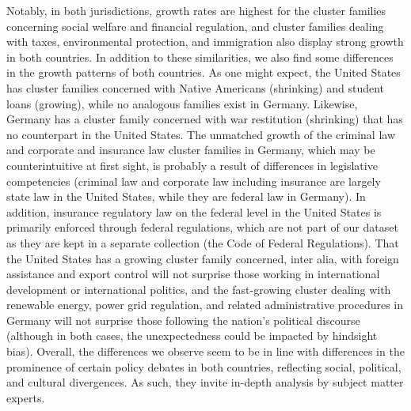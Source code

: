 Notably, in both jurisdictions, 
growth rates are highest for the cluster families concerning social welfare and financial regulation, 
and cluster families dealing with taxes, environmental protection, and immigration also display strong growth in both countries.
In addition to these similarities, we also find some differences in the growth patterns of both countries. 
As one might expect, 
the United States has cluster families concerned with Native Americans (shrinking) and student loans (growing),
while no analogous families exist in Germany.
Likewise, Germany has a cluster family concerned with war restitution (shrinking) that has no counterpart in the United States.
The unmatched growth of the criminal law and corporate and insurance law cluster families in Germany, which may be counterintuitive at first sight, 
is probably a result of differences in legislative competencies (criminal law and corporate law including insurance are largely state law in the United States, while they are federal law in Germany).
In addition, insurance regulatory law on the federal level in the United States is primarily enforced through federal regulations, 
which are not part of our dataset as they are kept in a separate collection (the Code of Federal Regulations).
That the United States has a growing cluster family concerned, inter alia, with foreign assistance and export control will not surprise those working in international development or international politics, 
and the fast-growing cluster dealing with renewable energy, power grid regulation, and related administrative procedures in Germany will not surprise those following the nation's political discourse (although in both cases, the unexpectedness could be impacted by hindsight bias).
Overall, the differences we observe seem to be in line with differences in the prominence of certain policy debates in both countries,
reflecting social, political, and cultural divergences.  
As such, they invite in-depth analysis by subject matter experts.

